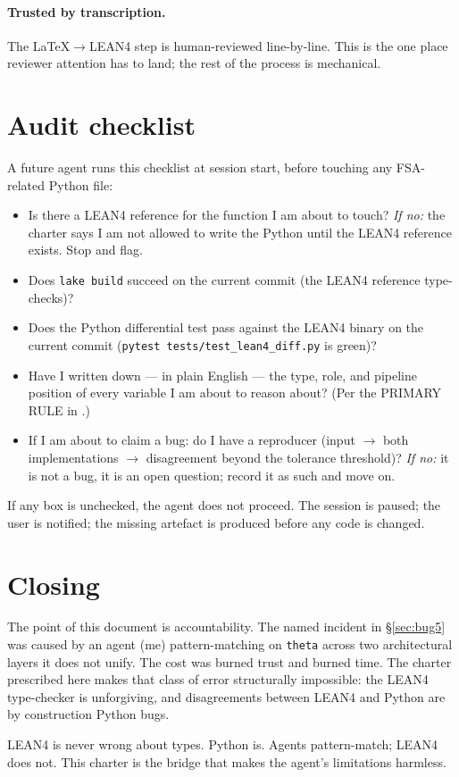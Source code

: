\documentclass[11pt,a4paper]{article}
\begin{document}
\paragraph{Trusted by transcription.} The LaTeX$\to$LEAN4 step is
human-reviewed line-by-line. This is the one place reviewer
attention has to land; the rest of the process is mechanical.

\section{Audit checklist}
\label{sec:checklist}

A future agent runs this checklist at session start, before
touching any FSA-related Python file:

\begin{itemize}
\item[$\square$] Is there a LEAN4 reference for the function I am
  about to touch? \emph{If no:} the charter says I am not allowed
  to write the Python until the LEAN4 reference exists. Stop and
  flag.
\item[$\square$] Does \texttt{lake build} succeed on the current
  commit (the LEAN4 reference type-checks)?
\item[$\square$] Does the Python differential test pass against
  the LEAN4 binary on the current commit (\texttt{pytest
  tests/test\_lean4\_diff.py} is green)?
\item[$\square$] Have I written down --- in plain English ---
  the type, role, and pipeline position of every variable I am
  about to reason about? (Per the PRIMARY RULE in
  .)
\item[$\square$] If I am about to claim a bug: do I have a
  reproducer (input $\to$ both implementations $\to$ disagreement
  beyond the tolerance threshold)? \emph{If no:} it is not a bug,
  it is an open question; record it as such and move on.
\end{itemize}

If any box is unchecked, the agent does not proceed. The session
is paused; the user is notified; the missing artefact is produced
before any code is changed.

\section{Closing}

The point of this document is accountability. The named incident
in §\ref{sec:bug5} was caused by an agent (me) pattern-matching on
\texttt{theta} across two architectural layers it does not unify.
The cost was burned trust and burned time. The charter prescribed
here makes that class of error structurally impossible: the
LEAN4 type-checker is unforgiving, and disagreements between LEAN4
and Python are by construction Python bugs.

LEAN4 is never wrong about types. Python is. Agents pattern-match;
LEAN4 does not. This charter is the bridge that makes the agent's
limitations harmless.
\end{document}
